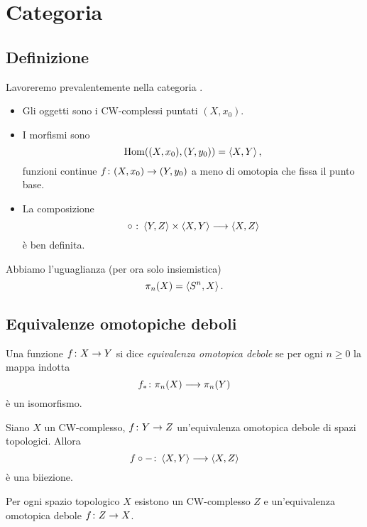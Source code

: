 \section*{Categoria \texorpdfstring{}{CW.}}
\subsection*{Definizione}
\begin{frame*}
Lavoreremo prevalentemente nella categoria .
\begin{itemize}
\item Gli oggetti sono i CW-complessi puntati $(X,x_0)$.
\item I morfismi sono
\[
\operatorname{Hom}((X,x_0),(Y,y_0))=\left\langle X,Y\right\rangle,
\]
funzioni continue $\map{f}{(X,x_0)}{(Y,y_0)}$ a meno di omotopia che fissa il punto base.
\item La composizione
\[
\map{{}\circ{}}{\hmaps{Y,Z}\times\hmaps{X,Y}}{\hmaps{X,Z}}
\]
è ben definita.
\end{itemize}
\begin{example}
Abbiamo l'uguaglianza (per ora solo insiemistica)
\[
\pi_n(X)=\left\langle S^n,X\right\rangle.
\]
\end{example}
\end{frame*}

\subsection*{Equivalenze omotopiche deboli}
\begin{frame*}
\begin{definition}
Una funzione $\map{f}{X}{Y}$ si dice \emph{equivalenza omotopica debole} se per ogni $n\ge 0$  la mappa indotta
\[
\map{f_*}{\pi_n(X)}{\pi_n(Y)}
\]
è un isomorfismo.
\end{definition}
\begin{proposition}
Siano $X$ un CW-complesso, $\map{f}{Y}{Z}$ un'equivalenza omotopica debole di spazi topologici. Allora
\[
\map{f\circ-}{\hmaps{X,Y}}{\hmaps{X,Z}}
\]
è una biiezione.
\end{proposition}
\begin{theorem}[Approssimazione CW]
Per ogni spazio topologico $X$ esistono un CW-complesso $Z$ e un'equivalenza omotopica debole
$\map{f}{Z}{X}$.
\end{theorem}
\end{frame*}

